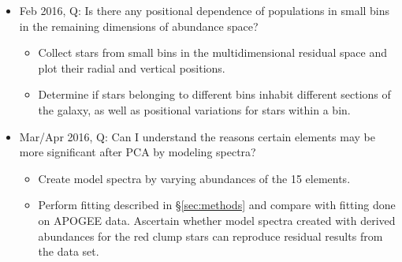 \documentclass[preprint]{aastex}
\begin{document}
\begin{itemize}
\begin{itemize}
\end{itemize}
\item Feb 2016, Q: Is there any positional dependence of populations in small bins in the remaining dimensions of abundance space?
\begin{itemize} 
\item Collect stars from small bins in the multidimensional residual space and plot their radial and vertical positions.
\item Determine if stars belonging to different bins inhabit different sections of the galaxy, as well as positional variations for stars within a bin.
\end{itemize}
\item Mar/Apr 2016, Q: Can I understand the reasons certain elements may be more significant after PCA by modeling spectra?
\begin{itemize}
\item Create model spectra by varying abundances of the 15 elements.
\item Perform fitting described in \S\ref{sec:methods} and compare with fitting done on APOGEE data. Ascertain whether model spectra created with derived abundances for the red clump stars can reproduce residual results from the data set.
\end{itemize}
\end{itemize}


\end{document}
